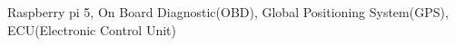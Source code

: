 \begin{IEEEkeywords}
Raspberry pi 5, On Board Diagnostic(OBD), Global Positioning System(GPS), ECU(Electronic Control Unit)
\end{IEEEkeywords}